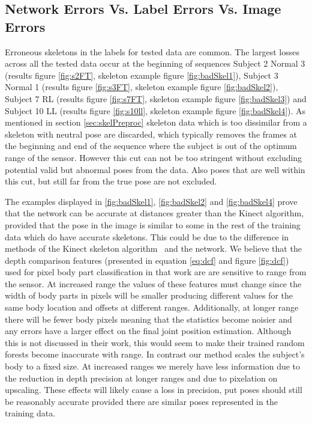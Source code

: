 \documentclass[11pt]{article} %
\begin{document}
\subsection{Network Errors Vs. Label Errors Vs. Image Errors}
\label{sec:errs}
Erroneous skeletons in the labels for tested data are common. The largest losses across all the tested data occur at the beginning of sequences Subject 2 Normal 3 (results figure \ref{fig:s2FT}, skeleton example figure \ref{fig:badSkel1}), Subject 3 Normal 1 (results figure \ref{fig:s3FT}, skeleton example figure \ref{fig:badSkel2}), Subject 7 RL (results figure \ref{fig:s7FT}, skeleton example figure \ref{fig:badSkel3}) and Subject 10 LL (results figure \ref{fig:s10ll}, skeleton example figure \ref{fig:badSkel4}). As mentioned in section \ref{sec:skelPreproc} skeleton data which is too dissimilar from a skeleton with neutral pose are discarded, which typically removes the frames at the beginning and end of the sequence where the subject is out of the optimum range of the sensor. However this cut can not be too stringent without excluding potential valid but abnormal poses from the data. Also poses that are well within this cut, but still far from the true pose are not excluded. 

The examples displayed in \ref{fig:badSkel1}, \ref{fig:badSkel2} and \ref{fig:badSkel4} prove that the network can be accurate at distances greater than the Kinect algorithm, provided that the pose in the image is similar to some in the rest of the training data which do have accurate skeletons. This could be due to the difference in methods of the Kinect skeleton algorithm~\cite{Shotton2011} and the network. We believe that the depth comparison features (presented in equation \ref{eq:dcf} and figure \ref{fig:dcf}) used for pixel body part classification in that work are are sensitive to range from the sensor. At increased range the values of these features must change since the width of body parts in pixels will be smaller producing different values for the same body location and offsets at different ranges. Additionally, at longer range there will be fewer body pixels meaning that the statistics become noisier and any errors have a larger effect on the final joint position estimation. Although this is not discussed in their work, this would seem to make their trained random forests become inaccurate with range. In contrast our method scales the subject's body to a fixed size. At increased ranges we merely have less information due to the reduction in depth precision at longer ranges and due to pixelation on upscaling. These effects will likely cause a loss in precision, put poses should still be reasonably accurate provided there are similar poses represented in the training data.
\end{document}
